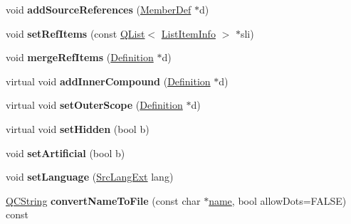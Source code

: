\begin{DoxyCompactItemize}
\item 
\hypertarget{class_definition_ab8506636e378947c77f8f01bb5bbe4bd}{void {\bfseries add\-Source\-References} (\hyperlink{class_member_def}{Member\-Def} $\ast$d)}\label{class_definition_ab8506636e378947c77f8f01bb5bbe4bd}

\item 
\hypertarget{class_definition_af54a06ad3eb9e93865968f0e10903184}{void {\bfseries set\-Ref\-Items} (const \hyperlink{class_q_list}{Q\-List}$<$ \hyperlink{struct_list_item_info}{List\-Item\-Info} $>$ $\ast$sli)}\label{class_definition_af54a06ad3eb9e93865968f0e10903184}

\item 
\hypertarget{class_definition_a1dae67d56622e5a9d2728e96afcc4547}{void {\bfseries merge\-Ref\-Items} (\hyperlink{class_definition}{Definition} $\ast$d)}\label{class_definition_a1dae67d56622e5a9d2728e96afcc4547}

\item 
\hypertarget{class_definition_a98509b9197b57394494196e01c70e540}{virtual void {\bfseries add\-Inner\-Compound} (\hyperlink{class_definition}{Definition} $\ast$d)}\label{class_definition_a98509b9197b57394494196e01c70e540}

\item 
\hypertarget{class_definition_a24ec2740d4516947e2578b95a281a58a}{virtual void {\bfseries set\-Outer\-Scope} (\hyperlink{class_definition}{Definition} $\ast$d)}\label{class_definition_a24ec2740d4516947e2578b95a281a58a}

\item 
\hypertarget{class_definition_a85f8b66f6d9e9acf89ae056554f82776}{virtual void {\bfseries set\-Hidden} (bool b)}\label{class_definition_a85f8b66f6d9e9acf89ae056554f82776}

\item 
\hypertarget{class_definition_ab33b7297907416d26747d5ad190f1638}{void {\bfseries set\-Artificial} (bool b)}\label{class_definition_ab33b7297907416d26747d5ad190f1638}

\item 
\hypertarget{class_definition_aab9d4a8a3085093c50fff4c540cfd6b1}{void {\bfseries set\-Language} (\hyperlink{types_8h_a9974623ce72fc23df5d64426b9178bf2}{Src\-Lang\-Ext} lang)}\label{class_definition_aab9d4a8a3085093c50fff4c540cfd6b1}

\item 
\hypertarget{class_definition_a7cbc481b496c988c7998afc0f6f3105f}{\hyperlink{class_q_c_string}{Q\-C\-String} {\bfseries convert\-Name\-To\-File} (const char $\ast$\hyperlink{class_definition_a2c310e06c9aadc6fb218f80fcbb5c695}{name}, bool allow\-Dots=F\-A\-L\-S\-E) const }\label{class_definition_a7cbc481b496c988c7998afc0f6f3105f}


\end{DoxyCompactItemize}
